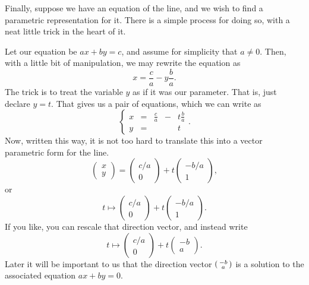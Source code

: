 \documentclass[00-livre-main.tex]{subfiles}
\begin{document}
Finally, suppose we have an equation of the line, and we wish to find a parametric representation for it. There is a simple process for doing so, with a neat little trick in the heart of it.

Let our equation be $ax+by=c$, and assume for simplicity that $a\neq 0$. Then, with a little bit of manipulation, we may rewrite the equation as 
\[
x = \frac{c}{a} - y \frac{b}{a}.
\]
The trick is to treat the variable $y$ as if it was our parameter. That is, just declare $y=t$. That gives us a pair of equations, which we can write as
\[
\left\{ \begin{array}{rrrrl} x & = & \frac{c}{a} & - & t\frac{b}{a} \\ y & = & & & t\end{array}\right. .
\]
Now, written this way, it is not too hard to translate this into a vector parametric form for the line.
\[
\begin{pmatrix} x \\ y \end{pmatrix} = \begin{pmatrix} c/a \\ 0 \end{pmatrix} + t \begin{pmatrix} -b/a \\ 1 \end{pmatrix},
\]
or
\[
t \mapsto \begin{pmatrix} c/a \\ 0 \end{pmatrix} + t \begin{pmatrix} -b/a \\ 1 \end{pmatrix} .
\]
If you like, you can rescale that direction vector, and instead write
\[
t \mapsto \begin{pmatrix} c/a \\ 0 \end{pmatrix} + t \begin{pmatrix} -b \\ a \end{pmatrix} .
\]
Later it will be important to us that the direction vector $\left(\begin{smallmatrix} -b \\ a \end{smallmatrix}\right)$ is a solution to the associated equation $ax+by=0$.
\end{document}
